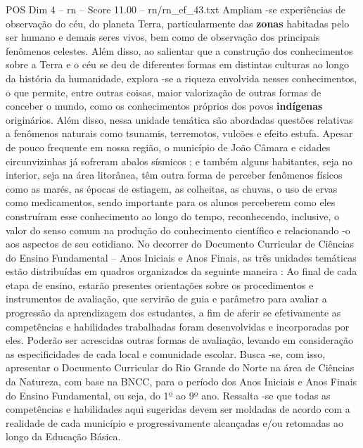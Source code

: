 \begin{textsample}{POS Dim 4 – rn – Score 11.00 – rn/rn\_ef\_43.txt}
Ampliam -se experiências de observação do céu, do planeta Terra, particularmente das \textbf{zonas} habitadas pelo ser humano e demais seres vivos, bem como de observação dos principais fenômenos celestes.
Além disso, ao salientar que a construção dos conhecimentos sobre a Terra e o céu se deu de diferentes formas em distintas culturas ao longo da história da humanidade, explora -se a riqueza envolvida nesses conhecimentos, o que permite, entre outras coisas, maior valorização de outras formas de conceber o mundo, como os conhecimentos próprios dos povos \textbf{indígenas} originários.
Além disso, nessa unidade temática são abordadas questões relativas a fenômenos naturais como tsunamis, terremotos, vulcões e efeito estufa.
Apesar de pouco frequente em nossa região, o município de João Câmara e cidades circunvizinhas já sofreram abalos sísmicos ; e também alguns habitantes, seja no interior, seja na área litorânea, têm outra forma de perceber fenômenos físicos como as marés, as épocas de estiagem, as colheitas, as chuvas, o uso de ervas como medicamentos, sendo importante para os alunos perceberem como eles construíram esse conhecimento ao longo do tempo, reconhecendo, inclusive, o valor do senso comum na produção do conhecimento científico e relacionando -o aos aspectos de seu cotidiano.
No decorrer do Documento Curricular de Ciências do Ensino Fundamental – Anos Iniciais e Anos Finais, as três unidades temáticas estão distribuídas em quadros organizados da seguinte maneira : Ao final de cada etapa de ensino, estarão presentes orientações sobre os procedimentos e instrumentos de avaliação, que servirão de guia e parâmetro para avaliar a progressão da aprendizagem dos estudantes, a fim de aferir se efetivamente as competências e habilidades trabalhadas foram desenvolvidas e incorporadas por eles.
Poderão ser acrescidas outras formas de avaliação, levando em consideração as especificidades de cada local e comunidade escolar.
Busca -se, com isso, apresentar o Documento Curricular do Rio Grande do Norte na área de Ciências da Natureza, com base na BNCC, para o período dos Anos Iniciais e Anos Finais do Ensino Fundamental, ou seja, do 1º ao 9º ano.
Ressalta -se que todas as competências e habilidades aqui sugeridas devem ser moldadas de acordo com a realidade de cada município e progressivamente alcançadas e/ou retomadas ao longo da Educação Básica.

\end{textsample}

